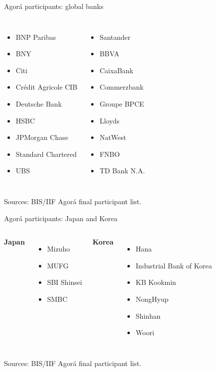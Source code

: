 \documentclass[aspectratio=169,12pt]{beamer}
\newcommand{\rust}[1]{\textcolor{Rust}{\textbf{#1}}}
\newcommand{\blue}[1]{\textcolor{Ocean}{\textbf{#1}}}
\newcommand{\source}[1]{\vfill\par\fontsize{5.4}{6.5}\selectfont\color{Quiet}Sources: #1}
\newcommand{\verytightitems}{\setlength{\itemsep}{0.22em}\setlength{\parskip}{0pt}}
\begin{document}
\begin{frame}{Agor\'a participants: global banks}
  \fontsize{10}{12}\selectfont
  \begin{columns}[T,onlytextwidth]
      \begin{itemize}\verytightitems
        \item BNP Paribas
        \item BNY
        \item Citi
        \item Cr\'edit Agricole CIB
        \item Deutsche Bank
        \item HSBC
        \item JPMorgan Chase
        \item Standard Chartered
        \item UBS
      \end{itemize}
      \begin{itemize}\verytightitems
        \item Santander
        \item BBVA
        \item CaixaBank
        \item Commerzbank
        \item Groupe BPCE
        \item Lloyds
        \item NatWest
        \item FNBO
        \item TD Bank N.A.
      \end{itemize}
  \end{columns}
  \source{BIS/IIF Agor\'a final participant list.}
\end{frame}

\begin{frame}{Agor\'a participants: Japan and Korea}
  \fontsize{10.3}{12.4}\selectfont
  \begin{columns}[T,onlytextwidth]
      \rust{Japan}
      \begin{itemize}\verytightitems
        \item Mizuho
        \item MUFG
        \item SBI Shinsei
        \item SMBC
      \end{itemize}
      \blue{Korea}
      \begin{itemize}\verytightitems
        \item Hana
        \item Industrial Bank of Korea
        \item KB Kookmin
        \item NongHyup
        \item Shinhan
        \item Woori
      \end{itemize}
  \end{columns}
  \source{BIS/IIF Agor\'a final participant list.}
\end{frame}
\end{document}
